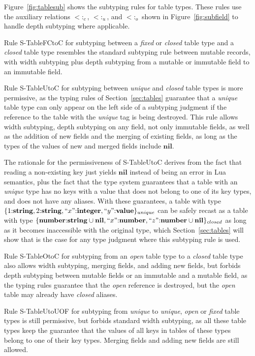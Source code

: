 \documentclass[10pt]{sigplanconf}
\newcommand{\Value}{\mathbf{value}}
\newcommand{\Nil}{\mathbf{nil}}
\newcommand{\Integer}{\mathbf{integer}}
\newcommand{\Number}{\mathbf{number}}
\newcommand{\String}{\mathbf{string}}
\newcommand{\subtype}{<:}
\begin{document}
Figure~\ref{fig:tablesub} shows the subtyping rules for
table types. These rules use the auxiliary relations
$\subtype_{c}$, $\subtype_{u}$, and $\subtype_{o}$
shown in Figure~\ref{fig:subfield} to handle depth
subtyping where applicable.

Rule {\sc S-TableFCtoC} for subtyping
between a {\em fixed} or {\em closed}
table type and a {\em closed} table type resembles the
standard subtyping rule between mutable records, with
width subtyping plus depth subtyping from a mutable
or immutable field to an immutable field.

Rule {\sc S-TableUtoC} for subtyping between {\em unique} and {\em closed} table types is more permissive, as the typing rules of Section~\ref{sec:tables} guarantee that a {\em unique}
table type can only appear on the left side of a subtyping
judgment if the reference to the table with the {\em unique}
tag is being destroyed. This rule allows width subtyping, depth subtyping on any field, not only immutable fields, as well as the addition of new fields and the merging of existing fields, as long as the types of the values of new and merged fields include $\Nil$. 

The rationale for the permissiveness of {\sc S-TableUtoC} derives from the fact that reading a non-existing key just yields $\Nil$ instead of being an error in Lua semantics, plus the fact
that the type system guarantees that a table with an
{\em unique} type has no keys with a value that does not
belong to one of its key types, and does not have any
aliases. With these guarantees, a table with type $\{1{:}\String, 2{:}\String,
``x"{:}\Integer, ``y"{:}\Value\}_{unique}$ can be safely recast as a table with type 
$\{\Number{:}\String \cup \Nil, ``x"{:}\Number, ``z"{:}
\Number \cup \Nil\}_{closed}$ as long as it becomes
inaccessible with the original type, which Section~\ref{sec:tables} will show that is the case
for any type judgment where this subtyping rule is used.

Rule {\sc S-TableOtoC} for subtyping from an {\em open} table type to a {\em closed} table type also allows width subtyping, merging fields, and adding new fields, but forbids depth subtyping between mutable fields or an immutable and a mutable field, as the typing rules guarantee that the {\em open} reference
is destroyed, but the {\em open} table may already have {\em closed} aliases.

Rule {\sc S-TableUtoUOF} for subtyping from {\em unique} to {\em unique}, {\em open} or {\em fixed} table types is still permissive, but forbids standard width subtyping, as all these table types keep the guarantee that the values of all keys in tables of these types belong to one of their key types. Merging fields and adding new fields are still allowed.
\end{document}
